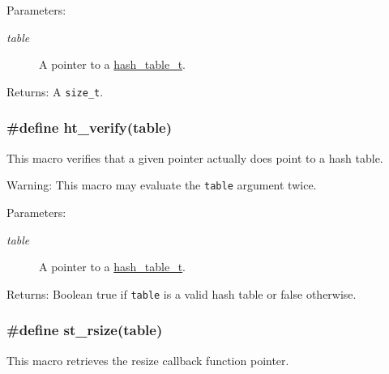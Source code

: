\begin{Desc}
\item[Parameters:]
\begin{description}
\item[{\em table}]A pointer to a \hyperlink{group__dbprim__hash_a0}{hash\_\-table\_\-t}.\end{description}
\end{Desc}
\begin{Desc}
\item[Returns:]A {\tt size\_\-t}. \end{Desc}
\hypertarget{group__dbprim__hash_a19}{
\subsubsection[ht\_\-verify]{\setlength{\rightskip}{0pt plus 5cm}\#define ht\_\-verify(table)}}
\label{group__dbprim__hash_a19}


This macro verifies that a given pointer actually does point to a hash table.

\begin{Desc}
\item[Warning:]This macro may evaluate the {\tt table} argument twice.\end{Desc}
\begin{Desc}
\item[Parameters:]
\begin{description}
\item[{\em table}]A pointer to a \hyperlink{group__dbprim__hash_a0}{hash\_\-table\_\-t}.\end{description}
\end{Desc}
\begin{Desc}
\item[Returns:]Boolean true if {\tt table} is a valid hash table or false otherwise. \end{Desc}
\hypertarget{group__dbprim__hash_a37}{
\subsubsection[st\_\-rsize]{\setlength{\rightskip}{0pt plus 5cm}\#define st\_\-rsize(table)}}
\label{group__dbprim__hash_a37}


This macro retrieves the resize callback function pointer.

